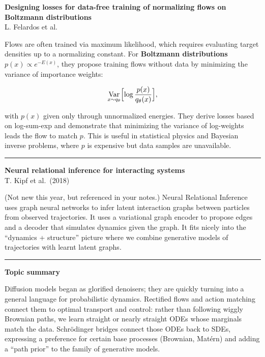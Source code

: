 \documentclass[a5paper]{article}
\def\subsection#1{{\par\bigskip\goodbreak\large\bfseries #1\par}}
\begin{document}
\textbf{Designing losses for data-free training of normalizing flows on
Boltzmann distributions}\\
L. Felardos et al.

Flows are often trained via maximum likelihood, which requires
evaluating target densities up to a normalizing constant. For
\textbf{Boltzmann distributions} $p(x)\propto e^{-E(x)}$, they propose
training flows without data by minimizing the variance of importance
weights:

\[ \operatorname*{Var}_{x\sim q_\theta}
\Bigl[\log \frac{p(x)}{q_\theta(x)}\Bigr], \]

with $p(x)$ given only through unnormalized energies. They derive losses
based on log-sum-exp and demonstrate that minimizing the variance of
log-weights leads the flow to match $p$. This is useful in statistical
physics and Bayesian inverse problems, where $p$ is expensive but data
samples are unavailable.

\begin{center}\rule{0.5\linewidth}{0.5pt}\end{center}

\textbf{Neural relational inference for interacting systems}\\
T. Kipf et al.~(2018)

(Not new this year, but referenced in your notes.) Neural Relational
Inference uses graph neural networks to infer latent interaction graphs
between particles from observed trajectories. It uses a variational
graph encoder to propose edges and a decoder that simulates dynamics
given the graph. It fits nicely into the ``dynamics + structure''
picture where we combine generative models of trajectories with learnt
latent graphs.

\begin{center}\rule{0.5\linewidth}{0.5pt}\end{center}

\subsection{Topic summary}\label{topic-summary-10}

Diffusion models began as glorified denoisers; they are quickly turning
into a general language for probabilistic dynamics. Rectified flows and
action matching connect them to optimal transport and control: rather
than following wiggly Brownian paths, we learn straight or nearly
straight ODEs whose marginals match the data. Schrödinger bridges
connect those ODEs back to SDEs, expressing a preference for certain
base processes (Brownian, Matérn) and adding a ``path prior'' to the
family of generative models.
\end{document}
